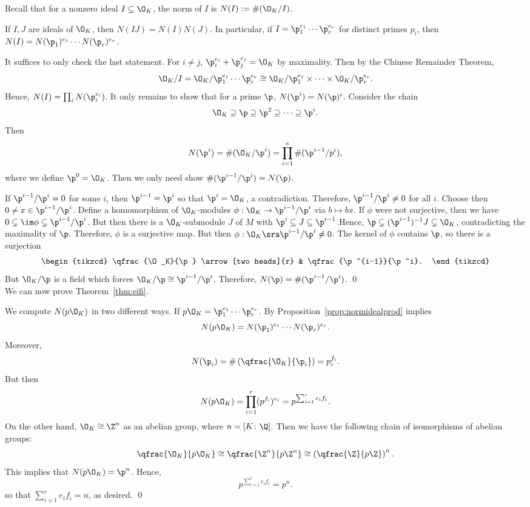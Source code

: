 Recall that for a nonzero ideal $I \subseteq \O_K$, the norm of $I$ is $N(I):= \#(\O_K/I)$. 

\begin{prop}\label{prop:normidealprod}
If $I,J$ are ideals of $\O_K$, then $N(IJ)=N(I)N(J)$. In particular, if $I=\p_1^{e_1}\cdots\p_r^{e_r}$ for distinct primes $p_i$, then $N(I)=N(\p_1)^{e_1} \cdots N(\p_r)^{e_r}$. 
\end{prop}

\pf It suffices to only check the last statement. For $i \neq j$, $\p_i^{e_i} + \p_j^{e_j}=\O_K$ by maximality. Then by the Chinese Remainder Theorem,
	\[
	\O_K/I = \O_K/\p_1^{e_1}\cdots\p_r^{e_r} \cong \O_K/\p_1^{e_1} \times \cdots \times \O_K/\p_r^{e_r}.
	\]
Hence, $N(I)=\prod_i N(\p_i^{e_i})$. It only remains to show that for a prime $\p$, $N(\p^i)=N(\p)^i$. Consider the chain
	\[
	\O_K \supseteq \p \supseteq \p^2 \supseteq \cdots \supseteq \p^i.
	\]
Then
	\[
	N(\p^i)= \#(\O_K/\p^i)= \prod_{i=1}^e \#(\p^{i-1}/p^i),
	\]
where we define $\p^0=\O_K$. Then we only need show $\#(\p^{i-1}/\p^i)=N(\p)$.

If $\p^{i-1}/\p^i=0$ for some $i$, then $\p^{i-1}=\p^i$ so that $\p^i=\O_K$, a contradiction. Therefore, $\p^{i-1}/\p^i \neq 0$ for all $i$. Choose then $0 \neq x \in \p^{i-1}/\p^i$. Define a homomorphism of $\O_K$-modules $\phi: \O_K \to \p^{i-1}/\p^i$ via $b \mapsto bx$. If $\phi$ were not surjective, then we have $0 \subsetneq \im \phi \subsetneq \p^{i-1}/\p^i$. But then there is a $\O_K$-submodule $J$ of $M$ with $\p^i \subseteq J \subseteq \p^{i-1}$.Hence, $\p \subsetneq (\p^{i-1})^{-1}J \subsetneq \O_K$, contradicting the maximality of $\p$. Therefore, $\phi$ is a surjective map. But then $\phi: \O_K \sra \p^{i-1}/\p^i \neq 0$. The kernel of $\phi$ contains $\p$, so there is a surjection
	\[
	\begin{tikzcd}
	\qfrac{\O_K}{\p} \arrow[two heads]{r} & \qfrac{\p^{i-1}}{\p^i}.
	\end{tikzcd}
	\]
But $\O_K/\p$ is a field which forces $\O_K/\p \cong \p^{i-1}/\p^i$. Therefore, $N(\p)=\#(\p^{i-1}/\p^i)$. \qed \\

We can now prove Theorem~\ref{thm:eifi}.

\eifi*\label{firstpageref}

\pf We compute $N(p\O_K)$ in two different ways. If $p\O_K=\p_1^{e_1} \cdots \p_r^{e_r}$. By Proposition~\ref{prop:normidealprod} implies
	\[
	N(p\O_K)= N(\p_1)^{e_1} \cdots N(\p_r)^{e_r}.
	\]
Moreover,
	\[
	N(\p_i)= \#\left(\qfrac{\O_K}{\p_i} \right)= p_i^{f_i}.
	\]
But then
	\[
	N(p\O_K)= \prod_{i=1}^r (p^{f_i})^{e_i} = p^{\sum_{i=1}^r e_if_i}.
	\]
On the other hand, $\O_K \cong \Z^n$ as an abelian group, where $n=[K \colon \Q]$. Then we have the following chain of isomorphisms of abelian groups:
	\[
	\qfrac{\O_K}{p\O_K} \cong \qfrac{\Z^n}{p\Z^n} \cong \left(\qfrac{\Z}{p\Z}\right)^n.
	\]
This implies that $N(p\O_K)=\p^n$. Hence,
	\[
	p^{\sum_{i=1}^r e_if_i}= p^n. 
	\]
so that $\sum_{i=1}^r e_if_i=n$, as desired. \qed \\

